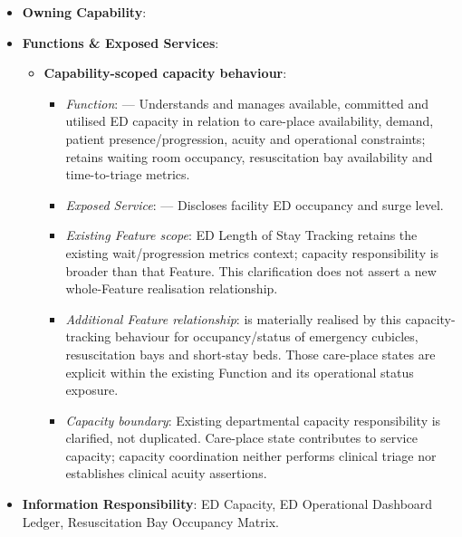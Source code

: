 \begin{itemize}

\item 
\textbf{Owning Capability}: \texttt{}



\item 
\textbf{Functions \& Exposed Services}:


\begin{itemize}

\item 
\textbf{Capability-scoped capacity behaviour}:


\begin{itemize}

\item 
\emph{Function}: \texttt{} — Understands and manages available, committed and utilised ED capacity in relation to care-place availability, demand, patient presence/\allowbreak{}progression, acuity and operational constraints; retains waiting room occupancy, resuscitation bay availability and time-to-triage metrics.



\item 
\emph{Exposed Service}: \texttt{} — Discloses facility ED occupancy and surge level.



\item 
\emph{Existing Feature scope}: ED Length of Stay Tracking retains the existing wait/\allowbreak{}progression metrics context; capacity responsibility is broader than that Feature. This clarification does not assert a new whole-Feature realisation relationship.



\item 
\emph{Additional Feature relationship}: \texttt{} is materially realised by this capacity-tracking behaviour for occupancy/\allowbreak{}status of emergency cubicles, resuscitation bays and short-stay beds. Those care-place states are explicit within the existing Function and its operational status exposure.



\item 
\emph{Capacity boundary}: Existing departmental capacity responsibility is clarified, not duplicated. Care-place state contributes to service capacity; capacity coordination neither performs clinical triage nor establishes clinical acuity assertions.



\end{itemize}


\end{itemize}


\item 
\textbf{Information Responsibility}: ED Capacity, ED Operational Dashboard Ledger, Resuscitation Bay Occupancy Matrix.



\end{itemize}
\label{rad:hso:131}

